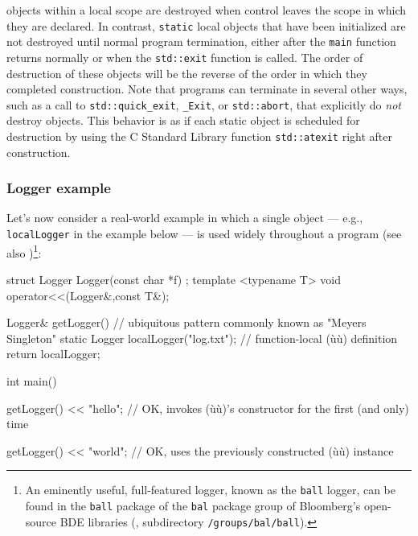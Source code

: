  objects within a local scope are destroyed when control
leaves the scope in which they are declared.
In contrast, \lstinline!static! local objects that have been initialized are
not destroyed until normal program termination,  either after the \lstinline!main! function returns
normally or when the \lstinline!std::exit! function is
called.
The order of destruction
of these objects will be the reverse of the order in which they completed construction.
Note that programs can terminate in several other ways,
such as a call to \lstinline!std::quick_exit!, \lstinline!_Exit!, or
\lstinline!std::abort!, that explicitly do \emph{not} destroy
   objects. This behavior is as if each static object is scheduled for destruction by using the C Standard Library function \lstinline!std::atexit! right after construction.


\subsubsection[Logger example]{Logger example}\label{logger-example}

Let's now consider a
real-world example in which a single object --- e.g.,
\lstinline!localLogger! in the example below --- is used widely throughout a program (see
also ){\cprotect\footnote{An
eminently useful, full-featured logger, known as the \texttt{ball} logger, can be found in the
\texttt{ball} package of the \texttt{bal} package group of Bloomberg's open-source
  BDE libraries (\cite{bde14}, subdirectory \texttt{/groups/bal/ball}).}}:

\begin{emcppshiddenlisting}[emcppsbatch=e3]
struct Logger {
  Logger(const char *f) {}
};
template <typename T>
void operator<<(Logger&,const T&);
\end{emcppshiddenlisting}
\begin{emcppslisting}[emcppsbatch=e3]
Logger& getLogger()  // ubiquitous pattern commonly known as "Meyers Singleton"
{
    static Logger localLogger("log.txt");  // function-local (ù{}ù) definition
    return localLogger;
}

int main()
{
    getLogger() << "hello";
        // OK, invokes (ù{}ù)'s constructor for the first (and only) time

    getLogger() << "world";
        // OK, uses the previously constructed (ù{}ù) instance
}
\end{emcppslisting}

